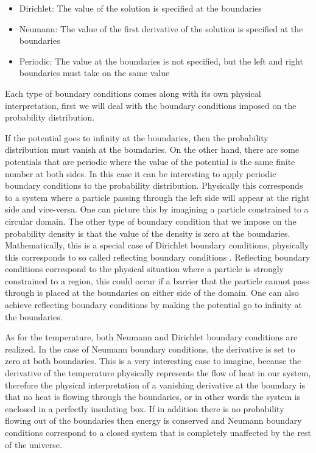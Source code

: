 \begin{itemize}
\item{Dirichlet: The value of the solution is specified at the boundaries}
\item{Neumann: The value of the first derivative of the solution is specified at the boundaries}
\item{Periodic: The value at the boundaries is not specified, but the left and right boundaries must take on the same value}
\end{itemize}
Each type of boundary conditions comes along with its own physical interpretation, first we will deal with the boundary conditions imposed on the probability distribution.

If the potential goes to infinity at the boundaries, then the probability distribution must vanish at the boundaries. On the other hand, there are some potentials that are periodic where the value of the potential is the same finite number at both sides. In this case it can be interesting to apply periodic boundary conditions to the probability distribution. Physically this corresponds to a system where a particle passing through the left side will appear at the right side and vice-versa. One can picture this by imagining a particle constrained to a circular domain. The other type of boundary condition that we impose on the probability density is that the value of the density is zero at the boundaries. Mathematically, this is a special case of Dirichlet boundary conditions, physically this corresponds to so called reflecting boundary conditions \cite{Gardiner2009}. Reflecting boundary conditions correspond to the physical situation where a particle is strongly constrained to a region, this could occur if a barrier that the particle cannot pass through is placed at the boundaries on either side of the domain. One can also achieve reflecting boundary conditions by making the potential go to infinity at the boundaries.

As for the temperature, both Neumann and Dirichlet boundary conditions are realized. In the case of Neumann boundary conditions, the derivative is set to zero at both boundaries. This is a very interesting case to imagine, because the derivative of the temperature physically represents the flow of heat in our system, therefore the physical interpretation of a vanishing derivative at the boundary is that no heat is flowing through the boundaries, or in other words the system is enclosed in a perfectly insulating box. If in addition there is no probability flowing out of the boundaries then energy is conserved and Neumann boundary conditions correspond to a closed system that is completely unaffected by the rest of the universe.

